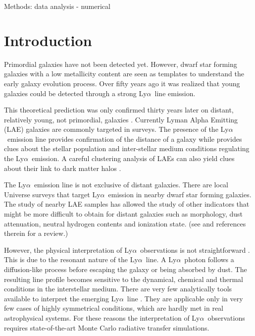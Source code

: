 \documentclass[a4,useAMS,usenatbib,usegraphicx]{mn2e}
\newcommand{\lya}{Ly$\alpha$}
\begin{document}
\begin{keywords}
Methods: data analysis - numerical 
\end{keywords}



\section{Introduction}
\label{sec:introduction}





Primordial galaxies have not been detected yet. 
However, dwarf star forming galaxies with a low metallicity content
are seen as templates to understand the early galaxy evolution process. 
Over fifty years ago \citep{PartridgePeebles} it was realized that
young galaxies could be detected through a strong \lya\ line
emission.  


This theoretical prediction was only confirmed thirty years later on
distant, relatively young, not primordial, galaxies \citep{1998ApJ...498L..93D}.
Currently Lyman Alpha Emitting (LAE) galaxies are commonly targeted
in surveys. 
The presence of the \lya\ emission line provides confirmation of
the distance of a galaxy while provides clues about the stellar
population and inter-stellar medium conditions regulating the
\lya\ emission.
A careful clustering analysis of LAEs can also yield clues about their link
to dark matter halos \cite{2016ApJ...828....5M}.

The \lya\ emission line is not exclusive of distant galaxies. 
There are local Universe surveys that target \lya\ emission in nearby
dwarf star forming galaxies.
The study of nearby LAE samples has allowed the study of other
indicators that might be more difficult to obtain for distant galaxies
such as morphology, dust attenuation, neutral hydrogen contents and
ionization state. (see \citep{Hayes15} and references therein for a review.) 

However, the physical interpretation of \lya\ observations is
not straightforward \citep{LARS,2015ApJ...805...14R}. 
This is due to the resonant nature of the \lya\ line. 
A \lya\ photon follows a diffusion-like process before escaping
the galaxy or being absorbed by dust. 
The resulting line profile becomes sensitive to the dynamical, chemical
and thermal conditions in the interstellar medium. 
There are very few analytically tools available to interpret the
emerging \lya\ line
\cite{Harrington73,1991ApJ...370L..85N,LoebRybicki,2006ApJ...645..792T}. 
They are applicable only in very few cases of highly symmetrical
conditions, which are hardly met in real astrophysical systems.
For these reasons the interpretation of \lya\ observations
requires state-of-the-art Monte Carlo radiative transfer simulations.   
\end{document}
